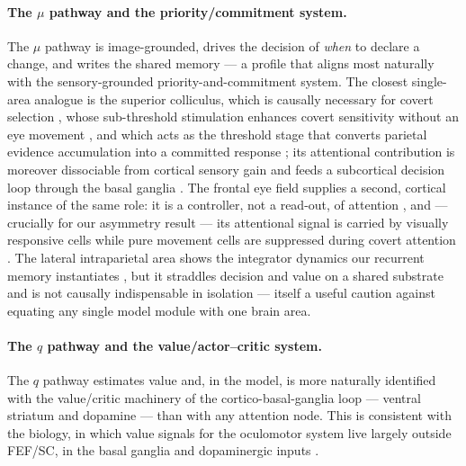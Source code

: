 \paragraph{The $\mu$ pathway and the priority/commitment system.}
The $\mu$ pathway is image-grounded, drives the decision of \emph{when} to declare a
change, and writes the shared memory --- a profile that aligns most naturally with the
sensory-grounded priority-and-commitment system. The closest single-area analogue is
the superior colliculus, which is causally necessary for covert selection
\citep{lovejoy2010inactivation, zenon2012attention, bollimunta2018fefsc}, whose
sub-threshold stimulation enhances covert sensitivity without an eye movement
\citep{muller2005microstimulation}, and which acts as the threshold stage that converts
parietal evidence accumulation into a committed response
\citep{stine2023differential}; its attentional contribution is moreover dissociable
from cortical sensory gain \citep{zenon2012attention} and feeds a subcortical decision
loop through the basal ganglia \citep{herman2020attention}. The frontal eye
field supplies a second, cortical instance of the same role: it is a controller, not a
read-out, of attention \citep{moore2003selective, armstrong2007selective,
wardak2006contribution, gregoriou2009high}, and --- crucially for our asymmetry result
--- its attentional signal is carried by visually responsive cells while pure
movement cells are suppressed during covert attention
\citep{thompson2005neuronal, gregoriou2012lesions}. The lateral intraparietal area
shows the integrator dynamics our recurrent memory instantiates
\citep{roitman2002response, huk2005neural}, but it straddles decision and value on a
shared substrate \citep{platt1999neural, sugrue2004matching} and is not causally
indispensable in isolation \citep{katz2016dissociated, jeurissen2022rhesus} ---
itself a useful caution against equating any single model module with one brain area.

\paragraph{The $q$ pathway and the value/actor--critic system.}
The $q$ pathway estimates value and, in the model, is more naturally identified with
the value/critic machinery of the cortico-basal-ganglia loop --- ventral striatum and
dopamine \citep{odoherty2004dissociable, schultz1997neural, joel2002actor} --- than
with any attention node. This is consistent with the biology, in which value signals
for the oculomotor system live largely outside FEF/SC, in the basal ganglia and
dopaminergic inputs \citep{hikosaka2006basal, hikosaka2014basal}.

